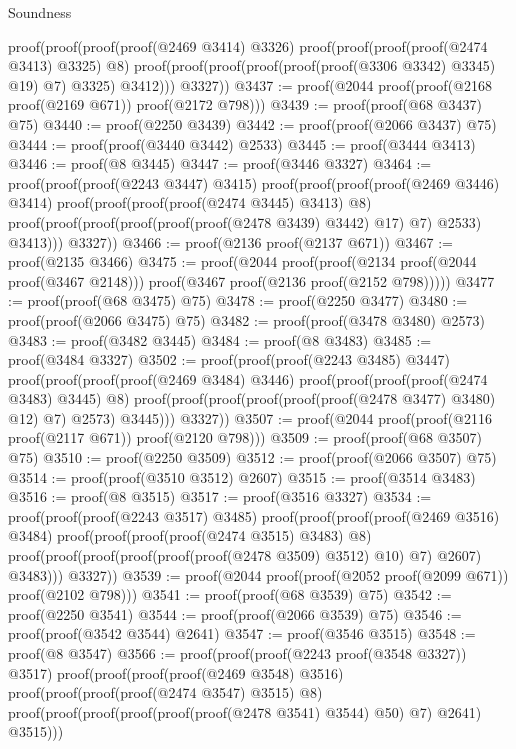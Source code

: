 \begin{lexlean}{Soundness}
\begin{coremodule}
      proof(proof(proof(proof(@2469 @3414) @3326)
            proof(proof(proof(proof(@2474 @3413) @3325) @8)
                proof(proof(proof(proof(proof(proof(@3306 @3342) @3345) @19) @7) @3325) @3412)))
          @3327))
@3437 := proof(@2044 proof(proof(@2168 proof(@2169 @671)) proof(@2172 @798)))
@3439 := proof(proof(@68 @3437) @75)
@3440 := proof(@2250 @3439)
@3442 := proof(proof(@2066 @3437) @75)
@3444 := proof(proof(@3440 @3442) @2533)
@3445 := proof(@3444 @3413)
@3446 := proof(@8 @3445)
@3447 := proof(@3446 @3327)
@3464 := proof(proof(proof(@2243 @3447) @3415)
      proof(proof(proof(proof(@2469 @3446) @3414)
            proof(proof(proof(proof(@2474 @3445) @3413) @8)
                proof(proof(proof(proof(proof(proof(@2478 @3439) @3442) @17) @7) @2533) @3413)))
          @3327))
@3466 := proof(@2136 proof(@2137 @671))
@3467 := proof(@2135 @3466)
@3475 := proof(@2044
      proof(proof(@2134 proof(@2044 proof(@3467 @2148)))
          proof(@3467 proof(@2136 proof(@2152 @798)))))
@3477 := proof(proof(@68 @3475) @75)
@3478 := proof(@2250 @3477)
@3480 := proof(proof(@2066 @3475) @75)
@3482 := proof(proof(@3478 @3480) @2573)
@3483 := proof(@3482 @3445)
@3484 := proof(@8 @3483)
@3485 := proof(@3484 @3327)
@3502 := proof(proof(proof(@2243 @3485) @3447)
      proof(proof(proof(proof(@2469 @3484) @3446)
            proof(proof(proof(proof(@2474 @3483) @3445) @8)
                proof(proof(proof(proof(proof(proof(@2478 @3477) @3480) @12) @7) @2573) @3445)))
          @3327))
@3507 := proof(@2044 proof(proof(@2116 proof(@2117 @671)) proof(@2120 @798)))
@3509 := proof(proof(@68 @3507) @75)
@3510 := proof(@2250 @3509)
@3512 := proof(proof(@2066 @3507) @75)
@3514 := proof(proof(@3510 @3512) @2607)
@3515 := proof(@3514 @3483)
@3516 := proof(@8 @3515)
@3517 := proof(@3516 @3327)
@3534 := proof(proof(proof(@2243 @3517) @3485)
      proof(proof(proof(proof(@2469 @3516) @3484)
            proof(proof(proof(proof(@2474 @3515) @3483) @8)
                proof(proof(proof(proof(proof(proof(@2478 @3509) @3512) @10) @7) @2607) @3483)))
          @3327))
@3539 := proof(@2044 proof(proof(@2052 proof(@2099 @671)) proof(@2102 @798)))
@3541 := proof(proof(@68 @3539) @75)
@3542 := proof(@2250 @3541)
@3544 := proof(proof(@2066 @3539) @75)
@3546 := proof(proof(@3542 @3544) @2641)
@3547 := proof(@3546 @3515)
@3548 := proof(@8 @3547)
@3566 := proof(proof(proof(@2243 proof(@3548 @3327)) @3517)
      proof(proof(proof(proof(@2469 @3548) @3516)
            proof(proof(proof(proof(@2474 @3547) @3515) @8)
                proof(proof(proof(proof(proof(proof(@2478 @3541) @3544) @50) @7) @2641) @3515)))

\end{coremodule}
\end{lexlean}
